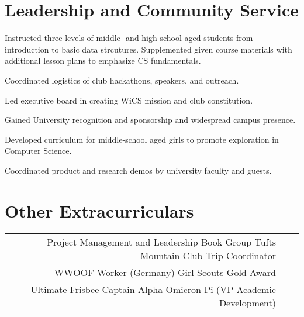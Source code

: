 \documentclass[]{csaund-resume}
\begin{document}
\begin{minipage}[t]{0.66\textwidth}

\section{Leadership and Community Service}
Instructed three levels of middle- and high-school aged students from introduction to basic data strcutures. Supplemented given course materials with additional lesson plans to emphasize CS fundamentals.
\sectionsep

\begin{tightemize}
\item Coordinated logistics of club hackathons, speakers, and outreach.
\item Led executive board in creating WiCS mission and club constitution.
\item Gained University recognition and sponsorship and widespread campus presence.
\end{tightemize}
\sectionsep

\begin{tightemize}
\item Developed curriculum for middle-school aged girls to promote exploration in Computer Science.
\item Coordinated product and research demos by university faculty and guests.
\end{tightemize}
\sectionsep


\section{Other Extracurriculars}
\begin{tabular}{rll}
Project Management and Leadership Book Group \textbullet{} Tufts Mountain Club Trip Coordinator  \\
\textbullet{} WWOOF Worker (Germany) \textbullet{} Girl Scouts Gold Award \textbullet{} \\
Ultimate Frisbee Captain \textbullet{} Alpha Omicron Pi (VP Academic Development)
\end{tabular}
\sectionsep

\end{minipage}
\end{document}
